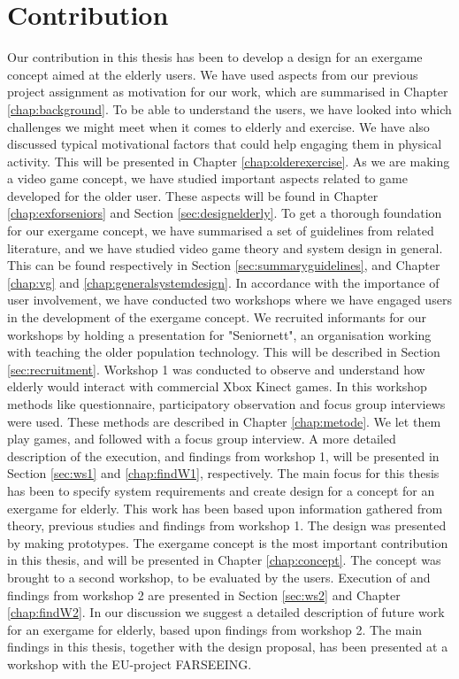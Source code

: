 \section{Contribution}
Our contribution in this thesis has been to develop a design for an exergame concept aimed at the elderly users. We have used aspects from our previous project assignment as motivation for our work, which are summarised in Chapter \ref{chap:background}. To be able to understand the users, we have looked into which challenges we might meet when it comes to elderly and exercise. We have also discussed typical motivational factors that could help engaging them in physical activity. This will be presented in Chapter \ref{chap:olderexercise}. As we are making a video game concept, we have studied important aspects related to game developed for the older user. These aspects will be found in Chapter \ref{chap:exforseniors} and Section \ref{sec:designelderly}. To get a thorough foundation for our exergame concept, we have summarised a set of guidelines from related literature, and we have studied video game theory and system design in general. This can be found respectively in Section \ref{sec:summaryguidelines}, and Chapter \ref{chap:vg} and \ref{chap:generalsystemdesign}. In accordance with the importance of user involvement, we have conducted two workshops where we have engaged users in the development of the exergame concept. We recruited informants for our workshops by holding a presentation for "Seniornett", an organisation working with teaching the older population technology. This will be described in Section \ref{sec:recruitment}. Workshop 1 was conducted to observe and understand how elderly would interact with commercial Xbox Kinect games. In this workshop methods like questionnaire, participatory observation and focus group interviews were used. These methods are described in Chapter \ref{chap:metode}. We let them play games, and followed with a focus group interview. A more detailed description of the execution, and findings from workshop 1, will be presented in Section \ref{sec:ws1} and \ref{chap:findW1}, respectively. The main focus for this thesis has been to specify system requirements and create design for a concept for an exergame for elderly. This work has been based upon information gathered from theory, previous studies and findings from workshop 1. The design was presented by making prototypes. The exergame concept is the most important contribution in this thesis, and will be presented in Chapter \ref{chap:concept}. The concept was brought to a second workshop, to be evaluated by the users. Execution of and findings from workshop 2 are presented in Section \ref{sec:ws2} and Chapter \ref{chap:findW2}. In our discussion we suggest a detailed description of future work for an exergame for elderly, based upon findings from workshop 2. The main findings in this thesis, together with the design proposal, has been presented at a workshop with the EU-project FARSEEING.  

